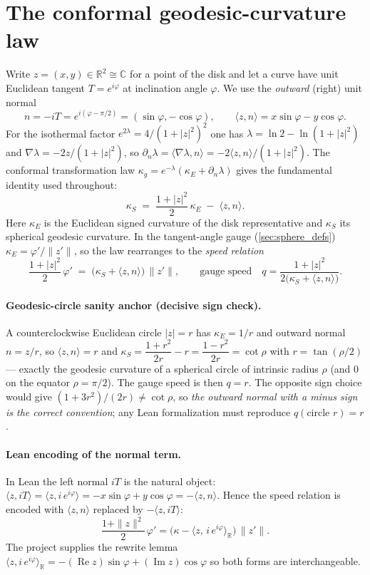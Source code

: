 \section{The conformal geodesic-curvature law}
\label{sec:sphere_conformal}

Write $z=(x,y)\in\mathbb R^2\cong\mathbb C$ for a point of the disk and let a curve have
unit Euclidean tangent $T=e^{i\varphi}$ at inclination angle $\varphi$. We use the
\emph{outward} (right) unit normal
\[
  n=-iT=e^{i(\varphi-\pi/2)}=(\sin\varphi,-\cos\varphi),\qquad
  \langle z,n\rangle=x\sin\varphi-y\cos\varphi .
\]
For the isothermal factor $e^{2\lambda}=4/(1+|z|^2)^2$ one has
$\lambda=\ln 2-\ln(1+|z|^2)$ and $\nabla\lambda=-2z/(1+|z|^2)$, so
$\partial_n\lambda=\langle\nabla\lambda,n\rangle=-2\langle z,n\rangle/(1+|z|^2)$. The
conformal transformation law $\kappa_g=e^{-\lambda}(\kappa_E+\partial_n\lambda)$ gives the
fundamental identity used throughout:
\[
  \kappa_S \;=\; \frac{1+|z|^2}{2}\,\kappa_E \;-\; \langle z,n\rangle .
\]
Here $\kappa_E$ is the Euclidean signed curvature of the disk representative and
$\kappa_S$ its spherical geodesic curvature. In the tangent-angle gauge (\cref{sec:sphere_defs})
$\kappa_E=\varphi'/\|z'\|$, so the law rearranges to the \emph{speed relation}
\[
  \frac{1+|z|^2}{2}\,\varphi' \;=\; \bigl(\kappa_S+\langle z,n\rangle\bigr)\,\|z'\| ,
  \qquad\text{gauge speed}\quad q=\frac{1+|z|^2}{2\bigl(\kappa_S+\langle z,n\rangle\bigr)} .
\]

\paragraph{Geodesic-circle sanity anchor (decisive sign check).}
A counterclockwise Euclidean circle $|z|=r$ has $\kappa_E=1/r$ and outward normal
$n=z/r$, so $\langle z,n\rangle=r$ and
$\kappa_S=\dfrac{1+r^2}{2r}-r=\dfrac{1-r^2}{2r}=\cot\rho$ with $r=\tan(\rho/2)$ — exactly
the geodesic curvature of a spherical circle of intrinsic radius $\rho$ (and $0$ on the
equator $\rho=\pi/2$). The gauge speed is then $q=r$. The opposite sign choice would give
$(1+3r^2)/(2r)\ne\cot\rho$, so \emph{the outward normal with a minus sign is the correct
convention}; any Lean formalization must reproduce $q(\text{circle }r)=r$.

\paragraph{Lean encoding of the normal term.}
In Lean the left normal $iT$ is the natural object: $\langle z,iT\rangle=\langle z,
i\,e^{i\varphi}\rangle=-x\sin\varphi+y\cos\varphi=-\langle z,n\rangle$. Hence the speed
relation is encoded with $\langle z,n\rangle$ replaced by $-\langle z,iT\rangle$:
\[
  \frac{1+\|z\|^2}{2}\,\varphi'
    =\bigl(\kappa-\langle z,\, i\,e^{i\varphi}\rangle_{\mathbb R}\bigr)\,\|z'\| .
\]
The project supplies the rewrite lemma
$\langle z, i\,e^{i\varphi}\rangle_{\mathbb R}=-(\operatorname{Re}z)\sin\varphi
+(\operatorname{Im}z)\cos\varphi$ so both forms are interchangeable.

